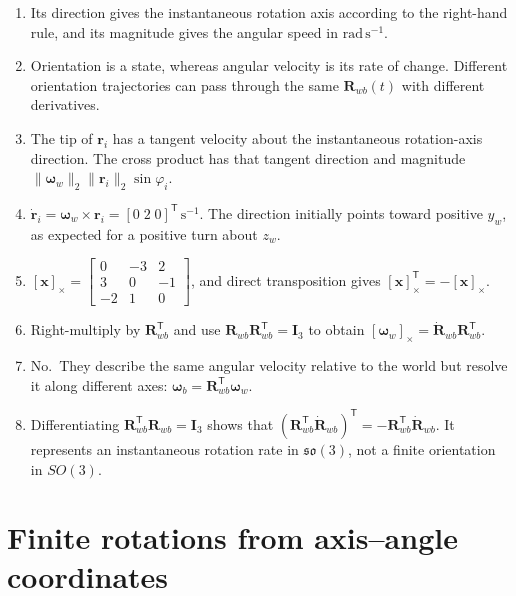 \documentclass[
  australian,
  12pt,
  letterpaper,
  DIV=11,
  numbers=noendperiod,
  twoside]{scrreprt}
\providecommand{\tightlist}{%
  \setlength{\itemsep}{0pt}\setlength{\parskip}{0pt}}
\begin{document}
\begin{enumerate}
\def\labelenumi{\arabic{enumi}.}
\tightlist
\item
  Its direction gives the instantaneous rotation axis according to the
  right-hand rule, and its magnitude gives the angular speed in
  \(\mathrm{rad\,s^{-1}}\).
\item
  Orientation is a state, whereas angular velocity is its rate of
  change. Different orientation trajectories can pass through the same
  \(\mathbf R_{wb}(t)\) with different derivatives.
\item
  The tip of \(\mathbf r_i\) has a tangent velocity about the
  instantaneous rotation-axis direction. The cross product has that
  tangent direction and magnitude
  \(\|\boldsymbol\omega_w\|_2\|\mathbf r_i\|_2\sin\varphi_i\).
\item
  \(\dot{\mathbf r}_i=\boldsymbol\omega_w\times\mathbf r_i=[0\;2\;0]^\mathsf T\,\mathrm{s^{-1}}\).
  The direction initially points toward positive \(y_w\), as expected
  for a positive turn about \(z_w\).
\item
  \([\mathbf x]_\times=\begin{bmatrix}0&-3&2\\3&0&-1\\-2&1&0\end{bmatrix}\),
  and direct transposition gives
  \([\mathbf x]_\times^\mathsf T=-[\mathbf x]_\times\).
\item
  Right-multiply by \(\mathbf R_{wb}^\mathsf T\) and use
  \(\mathbf R_{wb}\mathbf R_{wb}^\mathsf T=\mathbf I_3\) to obtain
  \([\boldsymbol\omega_w]_\times=\dot{\mathbf R}_{wb}\mathbf R_{wb}^\mathsf T\).
\item
  No.~They describe the same angular velocity relative to the world but
  resolve it along different axes:
  \(\boldsymbol\omega_b=\mathbf R_{wb}^\mathsf T\boldsymbol\omega_w\).
\item
  Differentiating \(\mathbf R_{wb}^\mathsf T\mathbf R_{wb}=\mathbf I_3\)
  shows that
  \((\mathbf R_{wb}^\mathsf T\dot{\mathbf R}_{wb})^\mathsf T=-\mathbf R_{wb}^\mathsf T\dot{\mathbf R}_{wb}\).
  It represents an instantaneous rotation rate in \(\mathfrak{so}(3)\),
  not a finite orientation in \(SO(3)\).
\end{enumerate}

\section{Finite rotations from axis--angle
coordinates}\label{sec-so3-axis-angle-exponential}
\end{document}
